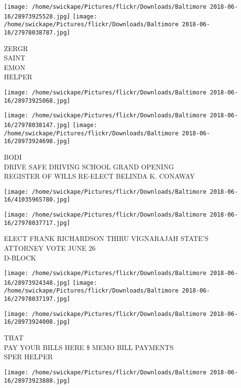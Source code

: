 \documentclass[10pt,letterpaper]{article}
\begin{document}
\texttt{[image: /home/swickape/Pictures/flickr/Downloads/Baltimore 2018-06-16/28973925528.jpg]}
\texttt{[image: /home/swickape/Pictures/flickr/Downloads/Baltimore 2018-06-16/27978038787.jpg]}

ZERGR\\
SAINT\\
EMON\\
HELPER\\
\pagebreak

\texttt{[image: /home/swickape/Pictures/flickr/Downloads/Baltimore 2018-06-16/28973925068.jpg]}

\vspace{0.25in}
\texttt{[image: /home/swickape/Pictures/flickr/Downloads/Baltimore 2018-06-16/27978038147.jpg]}
\texttt{[image: /home/swickape/Pictures/flickr/Downloads/Baltimore 2018-06-16/28973924698.jpg]}

BODI\\
DRIVE SAFE DRIVING SCHOOL GRAND OPENING\\
REGISTER OF WILLS RE{-}ELECT BELINDA K. CONAWAY\\
\pagebreak

\texttt{[image: /home/swickape/Pictures/flickr/Downloads/Baltimore 2018-06-16/41035965780.jpg]}

\vspace{0.25in}
\texttt{[image: /home/swickape/Pictures/flickr/Downloads/Baltimore 2018-06-16/27978037717.jpg]}

ELECT FRANK RICHARDSON THIRU VIGNARAJAH STATE'S ATTORNEY VOTE JUNE 26\\
D{-}BLOCK\\
\pagebreak

\texttt{[image: /home/swickape/Pictures/flickr/Downloads/Baltimore 2018-06-16/28973924348.jpg]}
\texttt{[image: /home/swickape/Pictures/flickr/Downloads/Baltimore 2018-06-16/27978037197.jpg]}

\texttt{[image: /home/swickape/Pictures/flickr/Downloads/Baltimore 2018-06-16/28973924008.jpg]}

THAT\\
PAY YOUR BILLS HERE \$ MEMO BILL PAYMENTS\\
SPER HELPER\\
\pagebreak

\texttt{[image: /home/swickape/Pictures/flickr/Downloads/Baltimore 2018-06-16/28973923888.jpg]}
\end{document}
